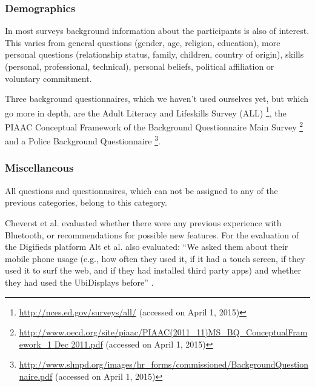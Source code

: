 	\subsubsection{Demographics}

		In most surveys background information about the participants is also of interest. This varies from general questions (gender, age, religion, education), more personal questions (relationship status, family, children, country of origin), skills (personal, professional, technical), personal beliefs, political affiliation or voluntary commitment.

		Three background questionnaires, which we haven't used ourselves yet, but which go more in depth, are the Adult Literacy and Lifeskills Survey (ALL) \footnote{\url{http://nces.ed.gov/surveys/all/} (accessed on April 1, 2015)}, the PIAAC Conceptual Framework of the Background Questionnaire Main Survey \footnote{\url{http://www.oecd.org/site/piaac/PIAAC(2011_11)MS_BQ_ConceptualFramework_1 Dec 2011.pdf} (accessed on April 1, 2015)} and a Police Background Questionnaire \footnote{\url{http://www.slmpd.org/images/hr_forms/commissioned/BackgroundQuestionnaire.pdf} (accessed on April 1, 2015)}.



	\subsubsection{Miscellaneous}

		All questions and questionnaires, which can not be assigned to any of the previous categories, belong to this category. 

		Cheverst et al. \cite{cheverst2005hermes} evaluated whether there were any previous experience with Bluetooth, or recommendations for possible new features.
		For the evaluation of the Digifieds platform Alt et al. also evaluated: ``We asked them about their mobile phone usage (e.g., how often they used it, if it had a touch screen, if they used it to surf the web, and if they had installed third party apps) and whether they had used the UbiDisplays before'' \cite{alt2011digifieds}.








	\label{table:standardized-questionnaires}

